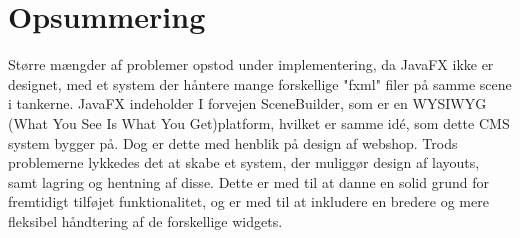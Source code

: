 \section{Opsummering}
Større mængder af problemer opstod under implementering, da JavaFX ikke er designet, med et system der håntere mange forskellige "fxml" filer på samme scene i tankerne. JavaFX indeholder I forvejen SceneBuilder, som er en WYSIWYG (What You See Is What You Get)platform, hvilket er samme idé, som dette CMS system bygger på. Dog er dette med henblik på design af webshop.
Trods problemerne lykkedes det at skabe et system, der muliggør design af layouts, samt lagring og hentning af disse. Dette er med til at danne en solid grund for fremtidigt tilføjet funktionalitet, og er med til at inkludere en bredere og mere fleksibel håndtering af de forskellige widgets.





\FloatBarrier